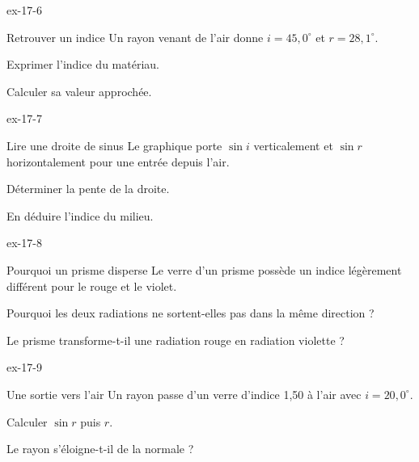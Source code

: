\begin{blocLivre}{ex-17-6}\begin{exercice}[2]{Retrouver un indice}
Un rayon venant de l’air donne $i=45,0^\circ$ et $r=28,1^\circ$.
\begin{questions}
\item Exprimer l’indice du matériau.
\item Calculer sa valeur approchée.
\end{questions}
\end{exercice}\end{blocLivre}
\begin{blocLivre}{ex-17-7}\begin{exercice}[2]{Lire une droite de sinus}
Le graphique porte $\sin i$ verticalement et $\sin r$ horizontalement pour une entrée depuis l’air.
\begin{questions}
\item Déterminer la pente de la droite.
\item En déduire l’indice du milieu.
\end{questions}
\end{exercice}\end{blocLivre}
\begin{blocLivre}{ex-17-8}\begin{exercice}[2]{Pourquoi un prisme disperse}
Le verre d’un prisme possède un indice légèrement différent pour le rouge et le violet.
\begin{questions}
\item Pourquoi les deux radiations ne sortent-elles pas dans la même direction ?
\item Le prisme transforme-t-il une radiation rouge en radiation violette ?
\end{questions}
\end{exercice}\end{blocLivre}
\begin{blocLivre}{ex-17-9}\begin{exercice}[3]{Une sortie vers l’air}
Un rayon passe d’un verre d’indice 1,50 à l’air avec $i=20,0^\circ$.
\begin{questions}
\item Calculer $\sin r$ puis $r$.
\item Le rayon s’éloigne-t-il de la normale ?
\end{questions}
\end{exercice}\end{blocLivre}
